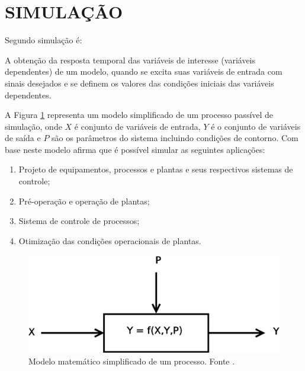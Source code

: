 \section{SIMULAÇÃO} 

Segundo  simulação é:

\begin{citacao}
A obtenção da resposta temporal das variáveis de interesse (variáveis dependentes) de um modelo, quando se excita suas variáveis de entrada com sinais desejados e se definem os valores das condições iniciais das variáveis dependentes.
\end{citacao}

A Figura \ref{simulacao} representa um modelo simplificado de um processo passível de simulação, onde $X$ é conjunto de variáveis de entrada, $Y$ é o conjunto de variáveis de saída e $P$ são os parâmetros do sistema incluindo condições de contorno. 
Com base neste modelo  afirma que é possível simular as seguintes aplicações:
\begin{enumerate}
	\item Projeto de equipamentos, processos e plantas e seus respectivos sistemas de controle;
	\item Pré-operação e operação de plantas;
	\item Sistema de controle de processos;
	\item Otimização das condições operacionais de plantas.
\end{enumerate}


\begin{figure}[ht]
	\centering
	\includegraphics[width=10 cm]{figuras/simulacao.eps}
	\caption{Modelo matemático simplificado de um processo. Fonte \cite{Garcia2009b}.}
    	\label{simulacao}
\end{figure}




